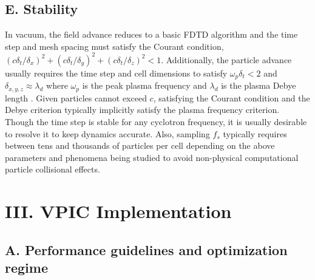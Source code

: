 \documentclass[letter,10pt]{article}
\begin{document}
\subsection{E. Stability}

In vacuum, the field advance reduces to a basic FDTD algorithm
\cite{Yee_1966} and the time step and mesh spacing must satisfy the
Courant condition,
$\left(c\delta_t/\delta_x\right)^2 +
 \left(c\delta_t/\delta_y\right)^2 +
 \left(c\delta_t/\delta_z\right)^2 < 1$.
Additionally, the particle advance usually requires the time step and
cell dimensions to satisfy $\omega_p \delta_t < 2$ and $\delta_{x,y,z}
\approx \lambda_d$ where $\omega_p$ is the peak plasma frequency and
$\lambda_d$ is the plasma Debye length
\cite{Birdsall_Langdon_1985,Hockney_Eastwood_1988}.
Given particles cannot exceed $c$, satisfying the Courant condition
and the Debye criterion typically implicitly satisfy the plasma
frequency criterion.  Though the time step is stable for any cyclotron
frequency, it is usually desirable to resolve it to keep dynamics
accurate.  Also, sampling $f_s$ typically requires between tens and
thousands of particles per cell depending on the above parameters and
phenomena being studied to avoid non-physical computational particle
collisional effects.

\section{III. VPIC Implementation}

\subsection{A. Performance guidelines and optimization regime}
\end{document}
